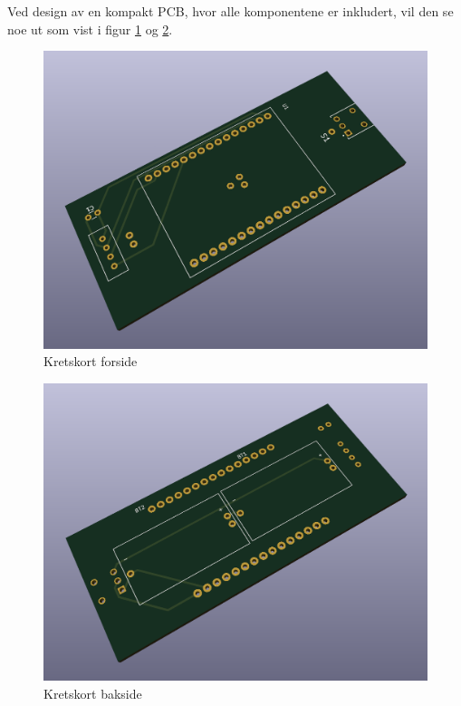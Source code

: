 Ved design av en kompakt PCB, hvor alle komponentene er inkludert, vil den se noe ut som vist i figur \ref{fig:kretskort forside uten komponenter} og \ref{fig:kretskort bakside uten komponenter}. \\
\begin{minipage}{\linewidth}
    \centering
    \begin{minipage}{0.45\linewidth}
      \begin{figure}[H]
          \includegraphics[width=\linewidth]{rapport/Images/implementering/PCB front.png}
          \caption{Kretskort forside}
          \label{fig:kretskort forside uten komponenter}
      \end{figure}
    \end{minipage}
    \hspace{0.05\linewidth}
    \begin{minipage}{0.45\linewidth}
      \begin{figure}[H]
          \includegraphics[width=\linewidth]{rapport/Images/implementering/PCB back.png}
          \caption{Kretskort bakside}
          \label{fig:kretskort bakside uten komponenter}
      \end{figure}
    \end{minipage}
  \end{minipage}

